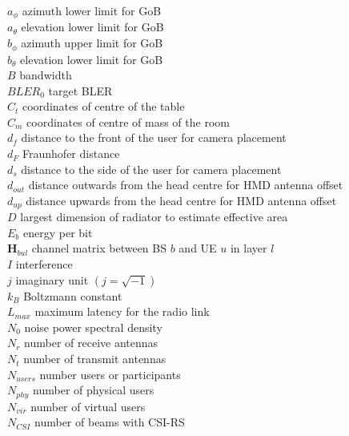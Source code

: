 $a_\phi$ \mytab azimuth lower limit for \acs{GoB}\\
$a_\theta$ \mytab elevation lower limit for \acs{GoB}\\
$b_\phi$ \mytab azimuth upper limit for \acs{GoB}\\
$b_\theta$ \mytab elevation lower limit for \acs{GoB} \\
$B$ \mytab bandwidth \\
$BLER_0$ \mytab target \acs{BLER} \\
$C_t$ \mytab coordinates of centre of the table \\
$C_m$ \mytab coordinates of centre of mass of the room \\
$d_f$ \mytab distance to the front of the user for camera placement \\
$d_F$ \mytab Fraunhofer distance \\
$d_s$ \mytab distance to the side of the user for camera placement \\
$d_{out}$ \mytab distance outwards from the head centre for \acs{HMD} antenna offset\\
$d_{up}$ \mytab distance upwards from the head centre for \acs{HMD} antenna offset\\
$D$ \mytab largest dimension of radiator to estimate effective area \\
$E_b$ \mytab energy per bit \\
$\bm{H}_{bul}$ \mytab channel matrix between BS $b$ and UE $u$ in layer $l$\\
$I$ \mytab interference\\
$j$ \mytab imaginary unit $\left(j = \sqrt{-1}\right)$\\
$k_B$ \mytab Boltzmann constant\\
$L_{max}$ \mytab maximum latency for the radio link \\
$N_0$ \mytab noise power spectral density \\
$N_r$ \mytab number of receive antennas \\
$N_t$ \mytab number of transmit antennas \\
$N_{users}$ \mytab number users or participants \\
$N_{phy}$ \mytab number of physical users \\
$N_{vir}$ \mytab number of virtual users \\
$N_{CSI}$ \mytab number of beams with CSI-RS\\
